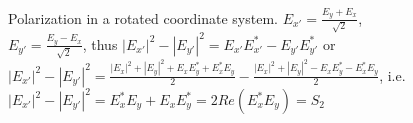 \begin{figure}
\centering



\caption{Polarization in a rotated coordinate system.
  $E_{x'} = \frac{E_y + E_x}{\sqrt{2}}$,
  $E_{y'} = \frac{E_y - E_x}{\sqrt{2}}$, thus
  $
  \left|E_{x'}\right|^2 -  \left|E_{y'}\right|^2 =
  E_{x'}E_{x'}^\ast -  E_{y'}E_{y'}^\ast
  $
  or
  $
  \left|E_{x'}\right|^2 -  \left|E_{y'}\right|^2
  = \frac{\left|E_x\right|^2 + \left|E_y\right|^2 + E_xE_y^\ast
    +E_x^\ast E_y }{2} -
  \frac{\left|E_x\right|^2 + \left|E_y\right|^2 - E_xE_y^\ast
    - E_x^\ast E_y }{2}
  $,
  i.e.
  $
  \left|E_{x'}\right|^2 -  \left|E_{y'}\right|^2
  = E_x^\ast E_y + E_xE_y^\ast = 2 Re\left(E_x^\ast E_y\right) = S_2
  $
}
\label{figPart3EntangS2}
\end{figure}